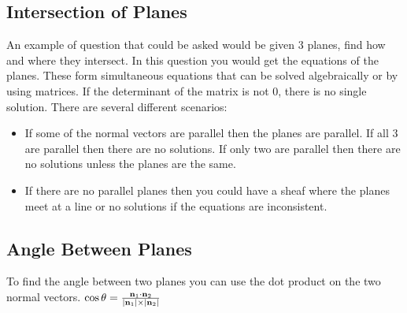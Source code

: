 \documentclass[a4paper,12pt]{article}
\begin{document}
\subsection*{Intersection of Planes}
An example of question that could be asked would be given 3 planes, find how and where they intersect. In this question you would get the equations of the planes. These form simultaneous equations that can be solved algebraically or by using matrices. If the determinant of the matrix is not 0, there is no single solution. There are several different scenarios:
\begin{itemize}
	\item If some of the normal vectors are parallel then the planes are parallel. If all 3 are parallel then there are no solutions. If only two are parallel then there are no solutions unless the planes are the same. 
	\item If there are no parallel planes then you could have a sheaf where the planes meet at a line or no solutions if the equations are inconsistent. 
\end{itemize}

\subsection*{Angle Between Planes}
To find the angle between two planes you can use the dot product on the two normal vectors.  $\cos \theta = \frac{\bold{n}_1 \cdot \bold{n}_2}{|\bold{n}_1| \times |\bold{n}_2|}$ 
\end{document}
